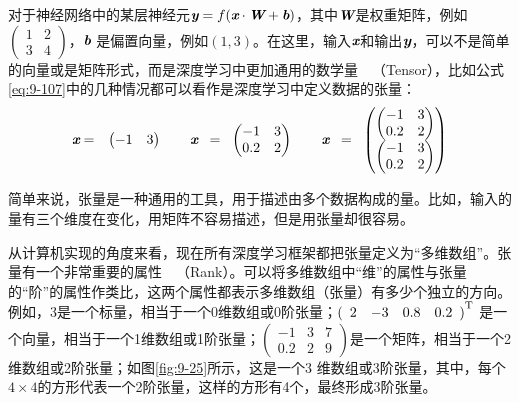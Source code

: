 \parinterval 对于神经网络中的某层神经元${\textbf{\em y}}=f({\textbf{\em x}}\cdot {\textbf{\em W}}+{\textbf{\em b}}) $，其中$ {\textbf{\em W}} $是权重矩阵，例如$ \begin{pmatrix} 1 & 2\\ 3 & 4\end{pmatrix} $，${\textbf{\em b}} $ 是偏置向量，例如$ (1,3) $。在这里，输入$ {\textbf{\em x}} $和输出$ {\textbf{\em y}} $，可以不是简单的向量或是矩阵形式，而是深度学习中更加通用的数学量\ \dash \ {\small{}}（Tensor），比如公式\eqref{eq:9-107}中的几种情况都可以看作是深度学习中定义数据的张量：
\begin{eqnarray}
{\textbf{\em x}}&=&\begin{pmatrix} -1 & 3\end{pmatrix}\qquad
{\textbf{\em x}}\;\;=\;\;\begin{pmatrix} -1 & 3\\ 0.2 & 2\end{pmatrix}\qquad
{\textbf{\em x}}\;\;=\;\;\begin{pmatrix}{\begin{pmatrix} -1 & 3\\ 0.2 & 2\end{pmatrix}}\\{\begin{pmatrix} -1 & 3\\ 0.2 & 2\end{pmatrix}}\end{pmatrix}
\label{eq:9-107}
\end{eqnarray}

\parinterval 简单来说，张量是一种通用的工具，用于描述由多个数据构成的量。比如，输入的量有三个维度在变化，用矩阵不容易描述，但是用张量却很容易。

\parinterval 从计算机实现的角度来看，现在所有深度学习框架都把张量定义为“多维数组”。张量有一个非常重要的属性\ \dash \ {\small{}}（Rank）。可以将多维数组中“维”的属性与张量的“阶”的属性作类比，这两个属性都表示多维数组（张量）有多少个独立的方向。例如，3是一个标量，相当于一个0维数组或0阶张量；$ {(\begin{array}{cccc} 2 & -3 & 0.8 & 0.2\end{array})}^{\textrm T} $ 是一个向量，相当于一个1维数组或1阶张量；$ \begin{pmatrix} -1 & 3 & 7\\ 0.2 & 2 & 9\end{pmatrix} $是一个矩阵，相当于一个2维数组或2阶张量；如图\ref{fig:9-25}所示，这是一个3 维数组或3阶张量，其中，每个$4 \times 4$的方形代表一个2阶张量，这样的方形有4个，最终形成3阶张量。

